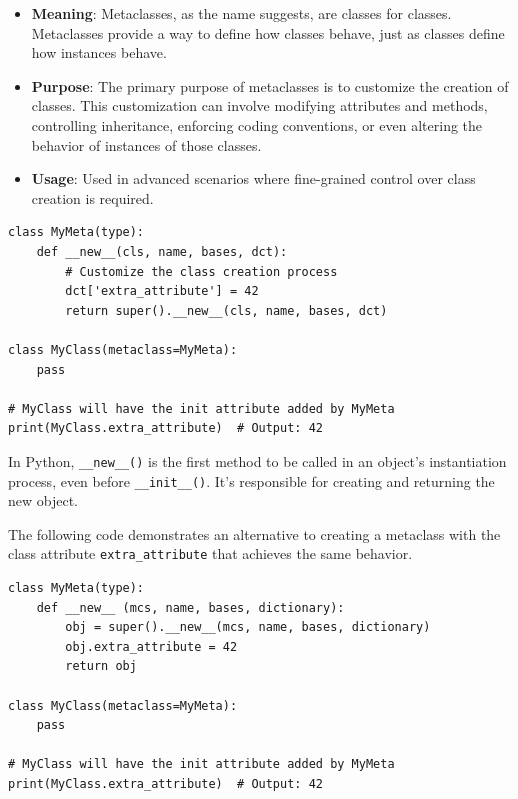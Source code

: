 \begin{itemize}
    \item \textbf{Meaning}:
    Metaclasses, as the name suggests, are classes for classes. Metaclasses provide a way to define how classes behave, just as classes define how instances behave.
    
    \item \textbf{Purpose}:
    The primary purpose of metaclasses is to customize the creation of classes. This customization can involve modifying attributes and methods, controlling inheritance, enforcing coding conventions, or even altering the behavior of instances of those classes.
    
    \item \textbf{Usage}:
    Used in advanced scenarios where fine-grained control over class creation is required.
\end{itemize}

\begin{codebox}
\begin{verbatim}
class MyMeta(type):
    def __new__(cls, name, bases, dct):
        # Customize the class creation process
        dct['extra_attribute'] = 42
        return super().__new__(cls, name, bases, dct)

class MyClass(metaclass=MyMeta):
    pass

# MyClass will have the init attribute added by MyMeta
print(MyClass.extra_attribute)  # Output: 42
\end{verbatim}
\end{codebox}

In Python, \texttt{\_\_new\_\_()} is the first method to be called in an object's instantiation process, even before \texttt{\_\_init\_\_()}. It's responsible for creating and returning the new object.

\newpage
The following code demonstrates an alternative to creating a metaclass with the class attribute \texttt{extra\_attribute} that achieves the same behavior.
\begin{codebox}
\begin{verbatim}
class MyMeta(type):
    def __new__ (mcs, name, bases, dictionary):
        obj = super().__new__(mcs, name, bases, dictionary)
        obj.extra_attribute = 42
        return obj

class MyClass(metaclass=MyMeta):
    pass

# MyClass will have the init attribute added by MyMeta
print(MyClass.extra_attribute)  # Output: 42
\end{verbatim}
\end{codebox}

